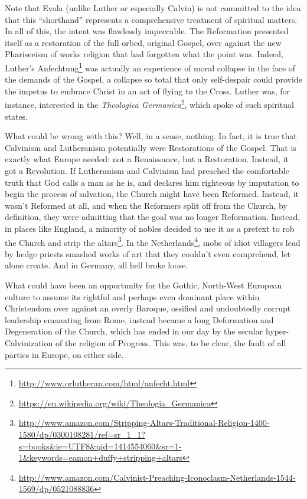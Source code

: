 Note that Evola (unlike Luther or especially Calvin) is not committed to the idea that this ``shorthand'' represents a comprehensive treatment of spiritual matters. In all of this, the intent was flawlessly impeccable. The Reformation presented itself as a restoration of the full orbed, original Gospel, over against the new Phariseeism of works religion that had forgotten what the point was. Indeed, Luther's Anfechtung\footnote{\url{http://www.orlutheran.com/html/anfecht.html}} was actually an experience of moral collapse in the face of the demands of the Gospel, a collapse so total that only self-despair could provide the impetus to embrace Christ in an act of flying to the Cross. Luther was, for instance, interested in the \emph{Theologica Germanica}\footnote{\url{https://en.wikipedia.org/wiki/Theologia\_Germanica}}, which spoke of such spiritual states.

What could be wrong with this? Well, in a sense, nothing. In fact, it is true that Calvinism and Lutheranism potentially were Restorations of the Gospel. That is exactly what Europe needed: not a Renaissance, but a Restoration. Instead, it got a Revolution. If Lutheranism and Calvinism had preached the comfortable truth that God calls a man as he is, and declares him righteous by imputation to begin the process of salvation, the Church might have been Reformed. Instead, it wasn't Reformed at all, and when the Reformers split off from the Church, by definition, they were admitting that the goal was no longer Reformation. Instead, in places like England, a minority of nobles decided to use it as a pretext to rob the Church and strip the altars\footnote{\url{http://www.amazon.com/Stripping-Altars-Traditional-Religion-1400-1580/dp/0300108281/ref=sr\_1\_1?s=books&ie=UTF8&qid=1414554060&sr=1-1&keywords=eamon+duffy+stripping+altars}}. In the Netherlands\footnote{\url{http://www.amazon.com/Calvinist-Preaching-Iconoclasm-Netherlands-1544-1569/dp/0521088836}}, mobs of idiot villagers lead by hedge priests smashed works of art that they couldn't even comprehend, let alone create. And in Germany, all hell broke loose.

What could have been an opportunity for the Gothic, North-West European culture to assume its rightful and perhaps even dominant place within Christendom over against an overly Baroque, ossified and undoubtedly corrupt leadership emanating from Rome, instead became a long Deformation and Degeneration of the Church, which has ended in our day by the secular hyper-Calvinization of the religion of Progress. This was, to be clear, the fault of all parties in Europe, on either side.


